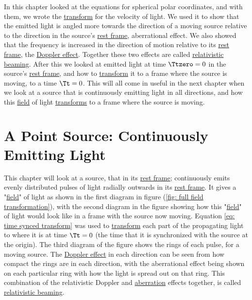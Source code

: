 In this chapter looked at the equations for spherical polar coordinates, and with them, we wrote the \hyperlink{def-transform}{transform} for the velocity of light.
We used it to show that the emitted light is angled more towards the direction of a moving source relative to the direction in the source's \hyperlink{def-proper-frame}{rest frame}, aberrational effect.
We also showed that the frequency is increased in the direction of motion relative to its \hyperlink{def-proper-frame}{rest frame}, the \hyperlink{def-doppler-effect}{Doppler effect}.
Together these two effects are called \hyperlink{def-relativistic-beaming}{relativistic beaming}.
After this we looked at emitted light at time $\Ttzero =0$ in the source's \hyperlink{def-proper-frame}{rest frame}, and how to \hyperlink{def-transform}{transform} it to a frame where the source is moving, to a time $\Tt =0$.
This will all come in useful in the next chapter when we look at a source that is continuously emitting light in all directions, and how this \hyperlink{def-field}{field} of light \hyperlink{def-transform}{transforms} to a frame where the source is moving.


%

\printbibliography[segment=\therefsegment, heading=subbibliography]

\chapter{A Point Source: Continuously Emitting Light} \label{ch: A Point Source Continually Emitting Light} %

This chapter will look at a source, that in its \hyperlink{def-proper-frame}{rest frame}; continuously emits evenly distributed pulses of light radially outwards in its \hyperlink{def-proper-frame}{rest frame}.
It gives a "\hyperlink{def-field}{field}" of light as shown in the first diagram in figure (\ref{fig: full field transformation}), with the second diagram in the figure showing how this "\hyperlink{def-field}{field}" of light would look like in a frame with the source now moving.
Equation \eqref{eq: time synced transform} was used to \hyperlink{def-transform}{transform} each part of the propagating light to where it is at time $\Tt =0$ (the time that it is synchronized with the source at the origin).
The third diagram of the figure shows the rings of each pulse, for a moving source.
The \hyperlink{def-doppler-effect}{Doppler effect} in each direction can be seen from how compact the rings are in each direction, with the aberrational effect being shown on each particular ring with how the light is spread out on that ring.
This combination of the relativistic Doppler and \hyperlink{def-aberration}{aberration} effects together, is called \hyperlink{def-relativistic-beaming}{relativistic beaming}.


